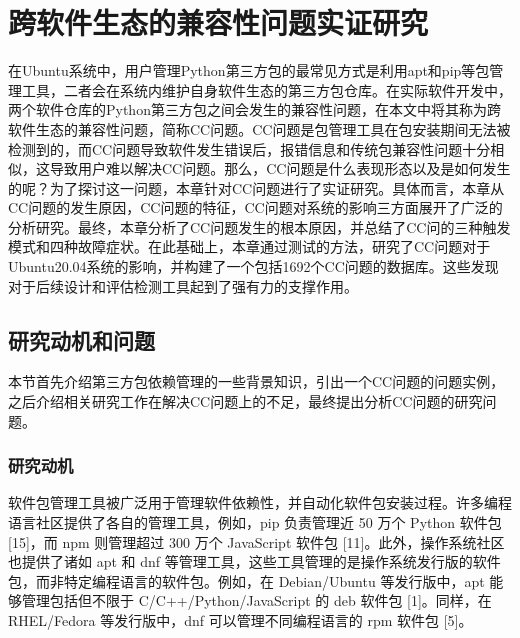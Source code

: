 \chapter{跨软件生态的兼容性问题实证研究}
在Ubuntu系统中，用户管理Python第三方包的最常见方式是利用apt和pip等包管理工具，二者会在系统内维护自身软件生态的第三方包仓库。在实际软件开发中，两个软件仓库的Python第三方包之间会发生的兼容性问题，在本文中将其称为跨软件生态的兼容性问题，简称CC问题。CC问题是包管理工具在包安装期间无法被检测到的，而CC问题导致软件发生错误后，报错信息和传统包兼容性问题十分相似，这导致用户难以解决CC问题。那么，CC问题是什么表现形态以及是如何发生的呢？为了探讨这一问题，本章针对CC问题进行了实证研究。具体而言，本章从CC问题的发生原因，CC问题的特征，CC问题对系统的影响三方面展开了广泛的分析研究。最终，本章分析了CC问题发生的根本原因，并总结了CC问的三种触发模式和四种故障症状。在此基础上，本章通过测试的方法，研究了CC问题对于Ubuntu20.04系统的影响，并构建了一个包括1692个CC问题的数据库。这些发现对于后续设计和评估检测工具起到了强有力的支撑作用。

\section{研究动机和问题}
本节首先介绍第三方包依赖管理的一些背景知识，引出一个CC问题的问题实例，之后介绍相关研究工作在解决CC问题上的不足，最终提出分析CC问题的研究问题。
\subsection{研究动机}
软件包管理工具被广泛用于管理软件依赖性，并自动化软件包安装过程。许多编程语言社区提供了各自的管理工具，例如，pip 负责管理近 50 万个 Python 软件包 [15]，而 npm 则管理超过 300 万个 JavaScript 软件包 [11]。此外，操作系统社区也提供了诸如 apt 和 dnf 等管理工具，这些工具管理的是操作系统发行版的软件包，而非特定编程语言的软件包。例如，在 Debian/Ubuntu 等发行版中，apt 能够管理包括但不限于 C/C++/Python/JavaScript 的 deb 软件包 [1]。同样，在 RHEL/Fedora 等发行版中，dnf 可以管理不同编程语言的 rpm 软件包 [5]。

